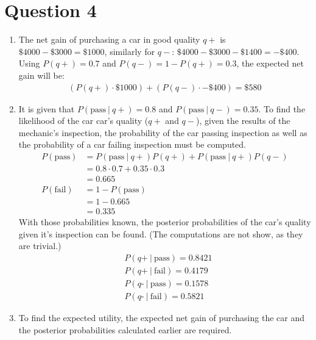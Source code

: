 \documentclass[a4paper, 12pt, one column, aas_macros]{article}
\newcommand\given[1][]{\:#1\vert\:}
\begin{document}
    \section*{Question 4}
      \begin{enumerate}[label=\alph*]
          \item
          	The net gain of purchasing a car in good quality $q+$ is $\$4000 - \$3000 = \$1000$, similarly for $q-$: $\$4000 - \$3000 - \$1400 = -\$400$. Using $P(q+) = 0.7$ and $P(q-) = 1 - P(q+) = 0.3$, the expected net gain will be: \begin{align*}(P(q+) \cdot \$1000) + (P(q-) \cdot -\$400) = \$580\end{align*}
            \item
            	It is given that $P(\text{pass} \given q+) = 0.8$ and $P(\text{pass} \given q-) = 0.35$. To find the likelihood of the car car's quality ($q+$ and $q-$), given the results of the mechanic's inspection, the probability of the car passing inspection as well as the probability of a car failing inspection must be computed. \begin{align*}
                	P(\text{pass}) &= P(\text{pass} \given q+)P(q+) + P(\text{pass} \given q+)P(q-) \\ 
                    &= 0.8 \cdot 0.7 + 0.35 \cdot 0.3 \\
                    &= 0.665 \\
                	P(\text{fail}) &= 1 - P(\text{pass}) \\ 
                    &= 1 - 0.665 \\
                    &= 0.335
                \end{align*}
			With those probabilities known, the posterior probabilities of the car's quality given it's inspection can be found. (The computations are not show, as they are trivial.) \begin{align*}
				&P(\textit{q}\text{+} \given \text{pass}) = 0.8421 \\
                &P(\textit{q}\text{+} \given \text{fail}) = 0.4179 \\
                &P(\textit{q}\text{-} \given \text{pass}) = 0.1578 \\
                &P(\textit{q}\text{-} \given \text{fail}) = 0.5821
			\end{align*}
      	\item
        	To find the expected utility, the expected net gain of purchasing the car and the posterior probabilities calculated earlier are required. \begin{enumerate}

\end{enumerate}
\end{enumerate}
\end{document}

